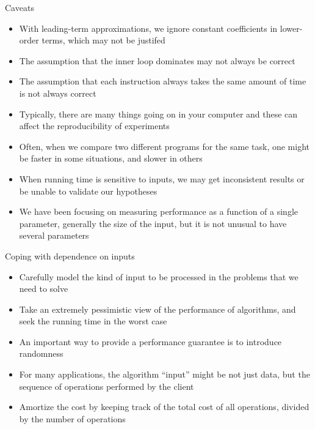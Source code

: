 \documentclass[8pt,a4paper,compress]{beamer}
\begin{document}
\begin{frame}[fragile]
Caveats
\begin{itemize}
\item With leading-term approximations, we ignore constant coefficients in lower-order terms, which may not be justifed

\item The assumption that the inner loop dominates may not always be correct 

\item The assumption that each instruction always takes the same amount of time is not always correct

\item Typically, there are many things going on in your computer and these can affect the reproducibility of experiments

\item Often, when we compare two different programs for the same task, one might be faster in some situations, and slower in others

\item When running time is sensitive to inputs, we may get inconsistent results or be unable to validate our hypotheses

\item We have been focusing on measuring performance as a function of a single parameter, generally the size of the input, but it is not unusual to have several parameters
\end{itemize}
\end{frame}

\begin{frame}[fragile]
Coping with dependence on inputs
\begin{itemize}
\item Carefully model the kind of input to be processed in the problems that we need to solve

\item Take an extremely pessimistic view of the performance of algorithms, and seek the running time in the worst case

\item An important way to provide a performance guarantee is to introduce randomness

\item For many applications, the algorithm ``input'' might be not just data, but the sequence of operations performed by the client

\item Amortize the cost by keeping track of the total cost of all operations, divided by the number of operations
\end{itemize}
\end{frame}
\end{document}
